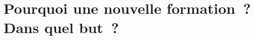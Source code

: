 \documentclass[8pt,xcolor=pdftex,table]{beamer}
\begin{document}




\section{{\alert{Pourquoi} une nouvelle formation~?\\Dans \alert{quel but}~?}}
\end{document}
